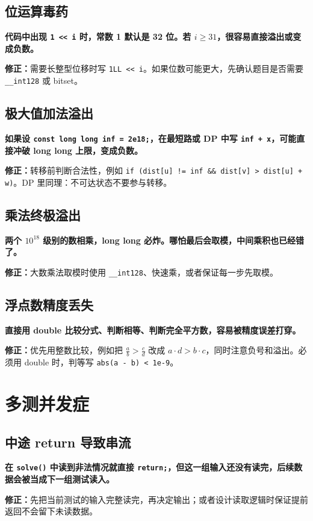 \documentclass[UTF8,openany,oneside,zihao=-4]{ctexbook}
\newcommand{\risk}[1]{%
  \vspace{0.35em}
  \noindent\colorbox{softred}{%
    \parbox{\dimexpr\linewidth-2\fboxsep}{\textcolor{danger}{\textbf{#1}}}}%
  \vspace{0.35em}
}
\newcommand{\fix}[1]{%
  \vspace{0.35em}
  \noindent\colorbox{softgreen}{%
    \parbox{\dimexpr\linewidth-2\fboxsep}{\textbf{修正：}#1}}%
  \vspace{0.35em}
}
\begin{document}
\subsection{位运算毒药}
\risk{代码中出现 \texttt{1 << i} 时，常数 1 默认是 32 位。若 $i \ge 31$，很容易直接溢出或变成负数。}

\fix{需要长整型位移时写 \texttt{1LL << i}。如果位数可能更大，先确认题目是否需要 \texttt{\_\_int128} 或 bitset。}

\subsection{极大值加法溢出}
\risk{如果设 \texttt{const long long inf = 2e18;}，在最短路或 DP 中写 \texttt{inf + x}，可能直接冲破 long long 上限，变成负数。}

\fix{转移前判断合法性，例如 \texttt{if (dist[u] != inf \&\& dist[v] > dist[u] + w)}。DP 里同理：不可达状态不要参与转移。}

\subsection{乘法终极溢出}
\risk{两个 $10^{18}$ 级别的数相乘，long long 必炸。哪怕最后会取模，中间乘积也已经错了。}

\fix{大数乘法取模时使用 \texttt{\_\_int128}、快速乘，或者保证每一步先取模。}

\subsection{浮点数精度丢失}
\risk{直接用 double 比较分式、判断相等、判断完全平方数，容易被精度误差打穿。}

\fix{优先用整数比较，例如把 $\frac{a}{b} > \frac{c}{d}$ 改成 $a\cdot d > b\cdot c$，同时注意负号和溢出。必须用 double 时，判等写 \texttt{abs(a - b) < 1e-9}。}

\section{多测并发症}

\subsection{中途 return 导致串流}
\risk{在 \texttt{solve()} 中读到非法情况就直接 \texttt{return;}，但这一组输入还没有读完，后续数据会被当成下一组测试读入。}

\fix{先把当前测试的输入完整读完，再决定输出；或者设计读取逻辑时保证提前返回不会留下未读数据。}
\end{document}
